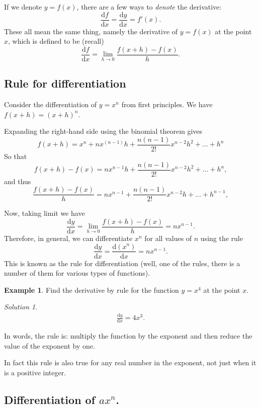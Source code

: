 \documentclass[
  english,
  11pt,
  oneside]{book}
\newcommand{\slide}{}
\theoremstyle{definition}
\theoremstyle{definition}
\newtheorem{example}{Example}[chapter]
\theoremstyle{definition}
\theoremstyle{definition}
\theoremstyle{remark}
\newtheorem*{solution}{Solution}
\begin{document}
If we denote \(y = f(x)\), there are a few ways to \emph{denote} the derivative:
\[\frac{\mathrm{d} f}{\mathrm{d} x} = \frac{\mathrm{d} y}{\mathrm{d} x} = f'(x).\]
These all mean the same thing, namely the derivative of \(y=f(x)\) at the point \(x\), which is defined to be (recall)
\[\frac{\mathrm{d} f}{\mathrm{d} x} = \lim\limits_{h\to0}\frac{f(x+h)-f(x)}{h}.\]

\slide

\subsection{Rule for differentiation}\label{rule-for-differentiation}

Consider the differentiation of \(y = x^n\) from first principles. We have \(f(x+h) = (x + h)^n\).

Expanding the right-hand side using the binomial theorem gives
\[f(x+h) = x^n + nx^{(n-1)}h+\frac{n(n-1)}{2!}x^{n-2}h^2+\ldots+h^n\]
So that
\[f(x+h)-f(x) = nx^{n-1}h+\frac{n(n-1)}{2!}x^{n-2}h^2+\ldots + h^n,\]
and thus
\[\frac{f(x+h)-f(x)}{h} = nx^{n-1}+\frac{n(n-1)}{2!}x^{n-2}h+\ldots + h^{n-1},\]
\slide
Now, taking limit we have
\[\frac{\mathrm{d} y}{\mathrm{d} x} = \lim\limits_{h\to0}\frac{f(x+h)-f(x)}{h} = nx^{n-1}.\]
Therefore, in general, we can differentiate \(x^n\) for all values of \(n\) using the rule
\[\frac{\mathrm{d} y}{\mathrm{d} x} = \frac{\mathrm{d} (x^n)}{\mathrm{d} x} = nx^{n-1}.\]
This is known as the rule for differentiation (well, one of the rules, there is a number of them for various types of functions).
\slide

\begin{example}
Find the derivative by rule for the function \(y = x^4\) at the point \(x\).
\end{example}

\begin{solution}
\begin{gather*}
\frac{\mathrm{d} y}{\mathrm{d} x} = 4x^3.
\end{gather*}
\end{solution}

In words, the rule is: multiply the function by the exponent and then reduce the value of the exponent by one.

In fact this rule is also true for any real number in the exponent, not just when it is a positive integer.

\slide

\subsection{\texorpdfstring{Differentiation of \(ax^n\).}{Differentiation of ax\^{}n.}}\label{differentiation-of-axn.}
\end{document}
